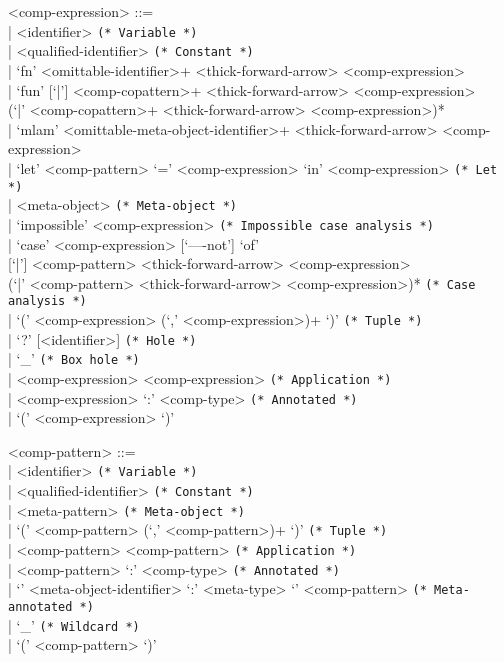 \documentclass[11pt]{article}
\begin{document}
\begin{grammar}
<comp-expression> ::= \hfill\\
| <identifier> \hfill \texttt{(* Variable *)}\\
| <qualified-identifier> \hfill \texttt{(* Constant *)}\\
| `fn' <omittable-identifier>+ <thick-forward-arrow> <comp-expression>\\
| `fun' [`|'] <comp-copattern>+ <thick-forward-arrow> <comp-expression>\\
  (`|' <comp-copattern>+ <thick-forward-arrow> <comp-expression>)*\\
| `mlam' <omittable-meta-object-identifier>+ <thick-forward-arrow> <comp-expression>\\
| `let' <comp-pattern> `=' <comp-expression> `in' <comp-expression> \hfill \texttt{(* Let *)}\\
| <meta-object> \hfill \texttt{(* Meta-object *)}\\
| `impossible' <comp-expression> \hfill \texttt{(* Impossible case analysis *)} \\
| `case' <comp-expression> [`----not'] `of'\\{}
  [`|'] <comp-pattern> <thick-forward-arrow> <comp-expression>\\
  (`|' <comp-pattern> <thick-forward-arrow> <comp-expression>)* \hfill \texttt{(* Case analysis *)}\\
| `(' <comp-expression> (`,' <comp-expression>)+ `)' \hfill \texttt{(* Tuple *)}\\
| `?' [<identifier>] \hfill \texttt{(* Hole *)}\\
| `_' \hfill \texttt{(* Box hole *)}\\
| <comp-expression> <comp-expression> \hfill \texttt{(* Application *)}\\
| <comp-expression> `:' <comp-type> \hfill \texttt{(* Annotated *)}\\
| `(' <comp-expression> `)'

<comp-pattern> ::= \hfill\\
| <identifier> \hfill \texttt{(* Variable *)}\\
| <qualified-identifier> \hfill \texttt{(* Constant *)}\\
| <meta-pattern> \hfill \texttt{(* Meta-object *)} \\
| `(' <comp-pattern> (`,' <comp-pattern>)+ `)' \hfill \texttt{(* Tuple *)}\\
| <comp-pattern> <comp-pattern> \hfill \texttt{(* Application *)}\\
| <comp-pattern> `:' <comp-type> \hfill \texttt{(* Annotated *)}\\
| `{' <meta-object-identifier> `:' <meta-type> `}' <comp-pattern> \hfill \texttt{(* Meta-annotated *)}\\
| `_' \hfill \texttt{(* Wildcard *)}\\
| `(' <comp-pattern> `)'


\end{grammar}
\end{document}
